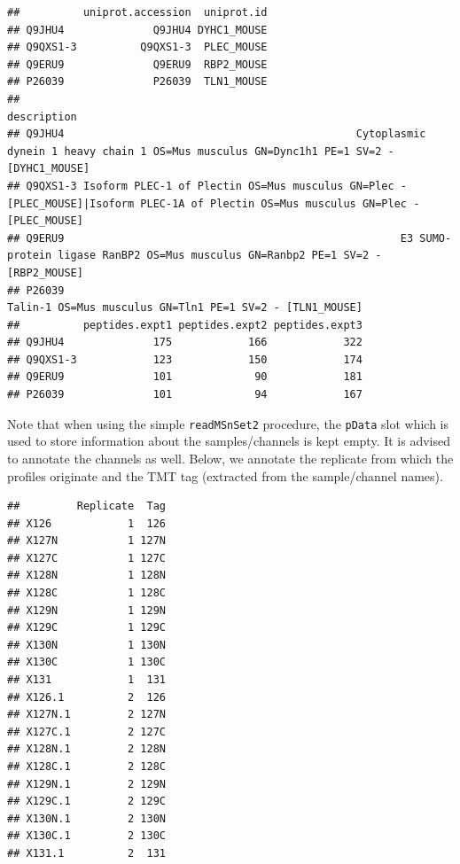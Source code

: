 \begin{knitrout}
\begin{kframe}
\begin{verbatim}
##          uniprot.accession  uniprot.id
## Q9JHU4              Q9JHU4 DYHC1_MOUSE
## Q9QXS1-3          Q9QXS1-3  PLEC_MOUSE
## Q9ERU9              Q9ERU9  RBP2_MOUSE
## P26039              P26039  TLN1_MOUSE
##                                                                                                                                 description
## Q9JHU4                                              Cytoplasmic dynein 1 heavy chain 1 OS=Mus musculus GN=Dync1h1 PE=1 SV=2 - [DYHC1_MOUSE]
## Q9QXS1-3 Isoform PLEC-1 of Plectin OS=Mus musculus GN=Plec - [PLEC_MOUSE]|Isoform PLEC-1A of Plectin OS=Mus musculus GN=Plec - [PLEC_MOUSE]
## Q9ERU9                                                     E3 SUMO-protein ligase RanBP2 OS=Mus musculus GN=Ranbp2 PE=1 SV=2 - [RBP2_MOUSE]
## P26039                                                                             Talin-1 OS=Mus musculus GN=Tln1 PE=1 SV=2 - [TLN1_MOUSE]
##          peptides.expt1 peptides.expt2 peptides.expt3
## Q9JHU4              175            166            322
## Q9QXS1-3            123            150            174
## Q9ERU9              101             90            181
## P26039              101             94            167
\end{verbatim}
\end{kframe}
\end{knitrout}

Note that when using the simple \texttt{readMSnSet2} procedure, the \texttt{pData}
slot which is used to store information about the samples/channels
is kept empty. It is advised to annotate the channels as
well. Below, we annotate the replicate from which the profiles
originate and the TMT tag (extracted from the sample/channel names).

\begin{knitrout}
\color{fgcolor}\begin{kframe}
\begin{alltt}
\hlopt{$} \hlkwb{<-} \hlstd{(}\hlopt{:}\hlstd{,}  \hlstd{=} \hlstd{)}
\hlopt{$} \hlkwb{<-} \hlstd{(}\hlstd{,} \hlstd{,} \hlstd{(}\hlstd{,} \hlstd{,} 
\end{alltt}
\begin{verbatim}
##         Replicate  Tag
## X126            1  126
## X127N           1 127N
## X127C           1 127C
## X128N           1 128N
## X128C           1 128C
## X129N           1 129N
## X129C           1 129C
## X130N           1 130N
## X130C           1 130C
## X131            1  131
## X126.1          2  126
## X127N.1         2 127N
## X127C.1         2 127C
## X128N.1         2 128N
## X128C.1         2 128C
## X129N.1         2 129N
## X129C.1         2 129C
## X130N.1         2 130N
## X130C.1         2 130C
## X131.1          2  131
\end{verbatim}
\end{kframe}
\end{knitrout}

